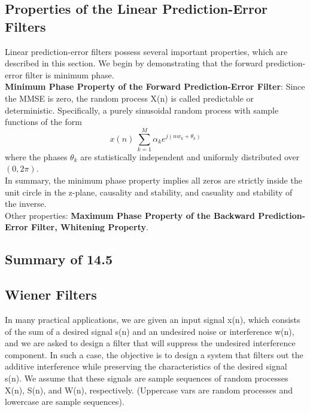 \documentclass{article}
\begin{document}
\subsection{Properties of the Linear Prediction-Error Filters }
Linear prediction-error filters possess several important properties, which
are described in this section. We begin by demonstrating that the forward
prediction-error filter is minimum phase. \\
\vspace{1em}
\textbf{Minimum Phase Property of the Forward Prediction-Error Filter}:  Since the MMSE is zero, the random process X(n) is called predictable or deterministic. Specifically, a purely sinusoidal
random process with sample functions of the form
\begin{equation}
x(n) \ \sum_{k=1}^{M}\alpha_ke^{j(nw_k+\theta_k)}
\end{equation}
where the phases $\theta_k$ are statistically independent and uniformly distributed over $(0,2\pi)$. \\
\vspace{1em}
In summary, the minimum phase property implies all zeros are strictly inside the unit circle in the z-plane, causality and stability, and casuality and stability of the inverse. \\
\vspace{1em}
Other properties: \textbf{Maximum Phase Property of the Backward Prediction-Error
Filter, Whitening Property}.



\subsection{Summary of 14.5}
\subsection{Wiener Filters}
In many practical applications, we are given an input signal x(n), which
consists of the sum of a desired signal s(n) and an undesired noise or interference w(n), and we are asked to design a filter that will suppress the undesired interference component. In such a case, the objective is to design a
system that filters out the additive interference while preserving the characteristics of the desired signal s(n). We assume that these signals are sample sequences of random processes X(n), S(n), and W(n), respectively. (Uppercase vars are random processes and lowercase are sample sequences).
\end{document}
